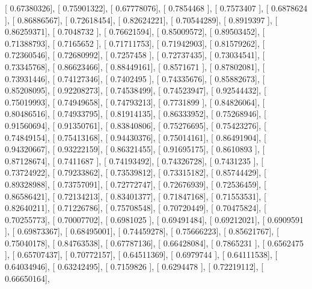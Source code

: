 \documentclass{article}
\begin{document}
       [ 0.67380326],
       [ 0.75901322],
       [ 0.67778076],
       [ 0.7854468 ],
       [ 0.7573407 ],
       [ 0.6878624 ],
       [ 0.86886567],
       [ 0.72618454],
       [ 0.82624221],
       [ 0.70544289],
       [ 0.8919397 ],
       [ 0.86259371],
       [ 0.7048732 ],
       [ 0.76621594],
       [ 0.85009572],
       [ 0.89503452],
       [ 0.71388793],
       [ 0.7165652 ],
       [ 0.71711753],
       [ 0.71942903],
       [ 0.81579262],
       [ 0.72360546],
       [ 0.72680992],
       [ 0.7257458 ],
       [ 0.72737435],
       [ 0.73034541],
       [ 0.73345768],
       [ 0.86623466],
       [ 0.88449161],
       [ 0.8571671 ],
       [ 0.87802081],
       [ 0.73931446],
       [ 0.74127346],
       [ 0.7402495 ],
       [ 0.74335676],
       [ 0.85882673],
       [ 0.85208095],
       [ 0.92208273],
       [ 0.74538499],
       [ 0.74523947],
       [ 0.92544432],
       [ 0.75019993],
       [ 0.74949658],
       [ 0.74793213],
       [ 0.7731899 ],
       [ 0.84826064],
       [ 0.80486516],
       [ 0.74933795],
       [ 0.81914135],
       [ 0.86333952],
       [ 0.75268946],
       [ 0.91560694],
       [ 0.91350761],
       [ 0.83840806],
       [ 0.75276695],
       [ 0.75423276],
       [ 0.74849154],
       [ 0.75413168],
       [ 0.94430376],
       [ 0.75014161],
       [ 0.86491904],
       [ 0.94320667],
       [ 0.93222159],
       [ 0.86321455],
       [ 0.91695175],
       [ 0.8610893 ],
       [ 0.87128674],
       [ 0.7411687 ],
       [ 0.74193492],
       [ 0.74326728],
       [ 0.7431235 ],
       [ 0.73724922],
       [ 0.79233862],
       [ 0.73539812],
       [ 0.73315182],
       [ 0.85744429],
       [ 0.89328988],
       [ 0.73757091],
       [ 0.72772747],
       [ 0.72676939],
       [ 0.72536459],
       [ 0.86586421],
       [ 0.72134213],
       [ 0.83401377],
       [ 0.71847168],
       [ 0.71553531],
       [ 0.82640211],
       [ 0.71226786],
       [ 0.75708548],
       [ 0.70720449],
       [ 0.70475824],
       [ 0.70255773],
       [ 0.70007702],
       [ 0.6981025 ],
       [ 0.69491484],
       [ 0.69212021],
       [ 0.6909591 ],
       [ 0.69873367],
       [ 0.68495001],
       [ 0.74459278],
       [ 0.75666223],
       [ 0.85621767],
       [ 0.75040178],
       [ 0.84763538],
       [ 0.67787136],
       [ 0.66428084],
       [ 0.7865231 ],
       [ 0.6562475 ],
       [ 0.65707437],
       [ 0.70772157],
       [ 0.64511369],
       [ 0.6979744 ],
       [ 0.64111538],
       [ 0.64034946],
       [ 0.63242495],
       [ 0.7159826 ],
       [ 0.6294478 ],
       [ 0.72219112],
       [ 0.66650164],
\end{document}
